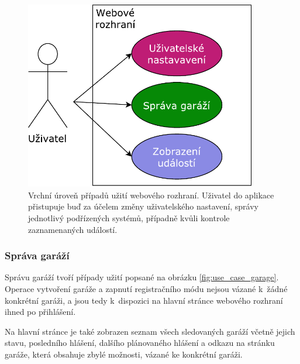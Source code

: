 \begin{figure}[h!]
    \centering
    \includegraphics[width=0.9\textwidth]{images/use_case_top.pdf}
    \caption[Vrchní úroveň případů užití webového rozhraní]{Vrchní úroveň případů užití webového rozhraní. Uživatel do aplikace přistupuje buď za účelem změny uživatelského nastavení, správy jednotlivý podřízených systémů, případně kvůli kontrole zaznamenaných událostí.}
    \label{fig:use_case_top}
\end{figure}

\subsubsection{Správa garáží}

Správu garáží tvoří případy užití popsané na obrázku \ref{fig:use_case_garage}. Operace vytvoření garáže a zapnutí registračního módu nejsou vázané k~žádné konkrétní garáži, a jsou tedy k~dispozici na hlavní stránce webového rozhraní ihned po přihlášení. 

Na hlavní stránce je také zobrazen seznam všech sledovaných garáží včetně jejich stavu, posledního hlášení, dalšího plánovaného hlášení a odkazu na stránku garáže, která obsahuje zbylé možnosti, vázané ke konkrétní garáži.

